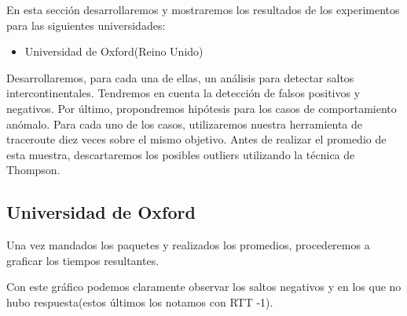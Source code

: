 En esta sección desarrollaremos y mostraremos los resultados de los experimentos para las siguientes
universidades:

\begin{itemize}
\item Universidad de Oxford(Reino Unido)
\end{itemize}

Desarrollaremos, para cada una de ellas, un análisis para detectar saltos intercontinentales. Tendremos
en cuenta la detección de falsos positivos y negativos. Por último, propondremos hipótesis para los casos
de comportamiento anómalo. Para cada uno de los casos, utilizaremos nuestra herramienta de traceroute diez veces
sobre el mismo objetivo. Antes de realizar el promedio de esta muestra, descartaremos los posibles outliers
utilizando la técnica de Thompson.

\subsection{Universidad de Oxford}

Una vez mandados los paquetes y realizados los promedios, procederemos a graficar los tiempos resultantes.


Con este gráfico podemos claramente observar los saltos negativos y en los que no hubo respuesta(estos
últimos los notamos con RTT -1).

